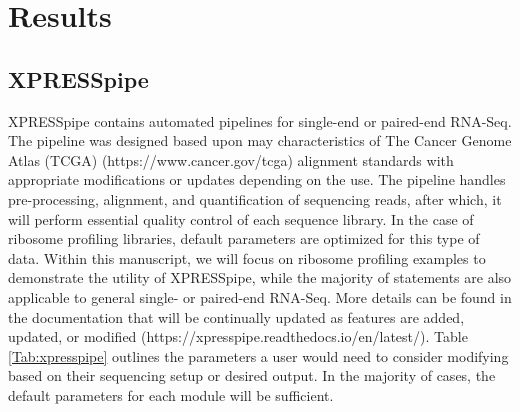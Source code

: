 \documentclass[10pt, oneside]{article}
\begin{document}
\section{Results}

\subsection{XPRESSpipe}
XPRESSpipe contains automated pipelines for single-end or paired-end RNA-Seq. The pipeline was designed based upon may characteristics of The Cancer Genome Atlas (TCGA) (https://www.cancer.gov/tcga) alignment standards with appropriate modifications or updates depending on the use. The pipeline handles pre-processing, alignment, and quantification of sequencing reads, after which, it will perform essential quality control of each sequence library. In the case of ribosome profiling libraries, default parameters are optimized for this type of data. Within this manuscript, we will focus on ribosome profiling examples to demonstrate the utility of XPRESSpipe, while the majority of statements are also applicable to general single- or paired-end RNA-Seq. More details can be found in the documentation that will be continually updated as features are added, updated, or modified (https://xpresspipe.readthedocs.io/en/latest/). Table \ref{Tab:xpresspipe} outlines the parameters a user would need to consider modifying based on their sequencing setup or desired output. In the majority of cases, the default parameters for each module will be sufficient. \par
\end{document}
